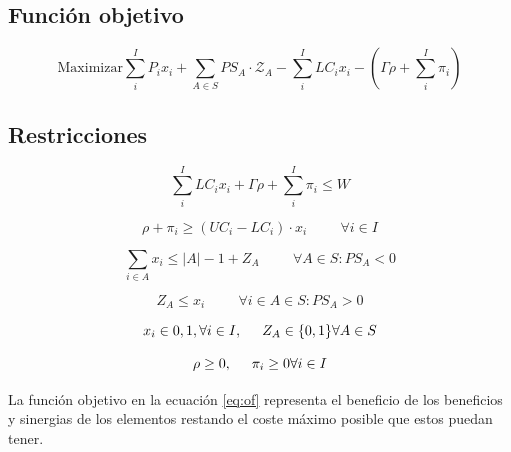 \documentclass[spanish, a4paper, 12pt, openany,final]{book}
\begin{document}
    
	\subsection{Función objetivo}
	
	
	\begin{equation}
		\label{eq:of}
		\text{Maximizar} \sum_i^I{P_ix_i} + \sum_{A\in S} PS_A\cdot \mathcal{Z}_A -
		\sum_i^I {LC_{i}x_i} - \left(\Gamma\rho+\sum_i^I \pi_i\right)
	\end{equation}

    \subsection{Restricciones}
    
    \begin{equation}
   		\label{eq:costs}
  		\sum_{i}^{I}{LC_ix_i} + \Gamma\rho+\sum_i^I \pi_i \leq W
    \end{equation}
    
    \begin{equation}
    	\label{eq:cost_relax}
    	\rho + \pi_i \geq \left(UC_i - LC_i\right)\cdot x_i 
    	\hspace{1cm}
    	 \forall i \in I
    \end{equation}
    
    \begin{equation}
    	\label{eq:fijar_z}
    	\sum_{i\in A} x_i \leq |A| - 1 + Z_{A} \hspace{1cm} \forall A \in S:PS_A < 0
    \end{equation}
   
    \begin{equation}
    	\label{eq:fijar_z_2}
    	Z_{A} \leq x_i \hspace{1cm} \forall i \in A \in S: PS_A > 0
    \end{equation}
    
    \begin{equation}
    	x_i \in {0,1},
    	\forall i \in I,
    	\hspace{0.5cm}
    	Z_{A} \in \{0,1\} \forall A \in S    	
    \end{equation}
    
    \begin{equation}
    	\rho \geq 0, 
    	\hspace{0.5cm}
 		\pi_i \geq 0 \forall i \in I
    \end{equation}
    
    
    La función objetivo en la ecuación \ref{eq:of} representa el beneficio de los beneficios y sinergias de los elementos restando el coste máximo posible que estos puedan tener.
    
\end{document}
